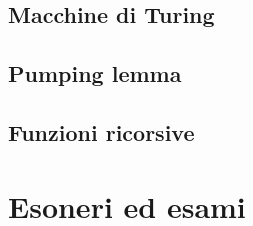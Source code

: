 \documentclass[12pt]{article}
\begin{document}
\newpage

\subsection{Macchine di Turing}


\newpage

\subsection{Pumping lemma}


\newpage

\subsection{Funzioni ricorsive}




\newpage
\section{Esoneri ed esami}

\end{document}
